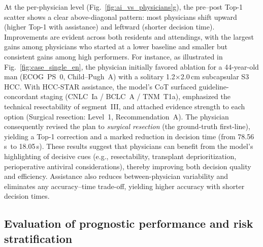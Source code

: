 \documentclass{article}
\begin{document}
At the per-physician level (Fig.~\ref{fig:ai_vs_physicians}g), the pre–post Top-1 scatter shows a clear above-diagonal pattern: most physicians shift upward (higher Top-1 with assistance) and leftward (shorter decision time). Improvements are evident across both residents and attendings, with the largest gains among physicians who started at a lower baseline and smaller but consistent gains among high performers.
For instance, as illustrated in Fig.~\ref{fig:case_single_en}, the physician initially favored ablation for a 44-year-old man (ECOG~PS~0, Child--Pugh~A) with a solitary 1.2\(\times\)2.0\,cm subcapsular S3 HCC. With HCC-STAR assistance, the model’s CoT surfaced guideline-concordant staging (CNLC~Ia / BCLC~A / TNM~T1a), emphasized the technical resectability of segment~III, and attached evidence strength to each option (Surgical resection: {Level~1, Recommendation~A}). The physician consequently revised the plan to \textit{surgical resection} (the ground-truth first-line), yielding a Top-1 correction and a marked reduction in decision time (from 78.56\,s\ to 18.05\,s). These results suggest that physicians can benefit from the model’s highlighting of decisive cues (e.g., resectability, transplant deprioritization, perioperative antiviral considerations), thereby improving both decision quality and efficiency. Assistance also reduces between-physician variability and eliminates any accuracy–time trade-off, yielding higher accuracy with shorter decision times.








\subsection{Evaluation of prognostic performance and risk stratification}
\end{document}
